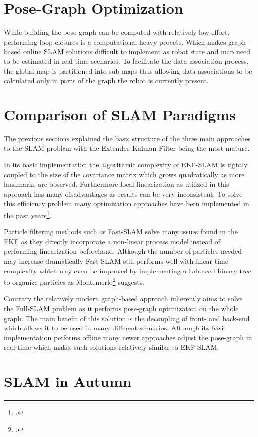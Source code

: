 \section{Pose-Graph Optimization}
While building the pose-graph can be computed with relatively low effort, performing loop-closures is a computational heavy process. Which makes graph-based online SLAM solutions difficult to implement as robot state and map need to be estimated in real-time scenarios. To facilitate the data association process, the global map is partitioned into sub-maps thus allowing data-associations to be calculated only in parts of the graph the robot is currently present. 

\section{Comparison of SLAM Paradigms}
The previous sections explained the basic structure of the three main approaches to the SLAM problem with the Extended Kalman Filter being the most mature. 

In its basic implementation the algorithmic complexity of EKF-SLAM is tightly coupled to the size of the covariance matrix which grows quadratically as more landmarks are observed. Furthermore local linearization as utilized in this approach has many disadvantages as results can be very inconsistent. To solve this efficiency problem many optimization approaches have been implemented in the past years\footcite{bailey2006simultaneous}.

Particle filtering methods such as Fast-SLAM solve many issues found in the EKF as they directly incorporate a non-linear process model instead of performing linearization beforehand. Although the number of particles needed may increase dramatically Fast-SLAM still performs well with linear  time-complexity which may even be improved by implementing a balanced binary tree to organize particles as Montemerlo\footcite{montemerlo2002fastslam} suggests. 

Contrary the relatively modern graph-based approach inherently aims to solve the Full-SLAM problem as it performs pose-graph optimization on the whole graph. The main benefit of this solution is the decoupling of front- and back-end which allows it to be used in many different scenarios. 
Although its basic implementation performs offline many newer approaches adjust the pose-graph in real-time which makes such solutions relatively similar to EKF-SLAM. 

\section{SLAM in Autumn}


